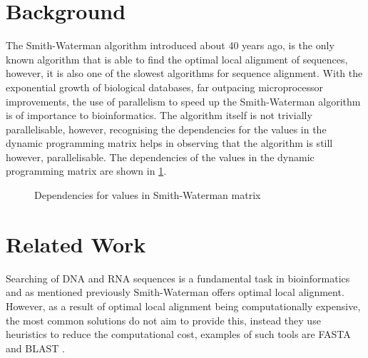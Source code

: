 \documentclass[manuscript,screen, nonacm=true]{acmart}
\begin{document}
\section{Background}
The Smith-Waterman \cite{smith1981identification} algorithm introduced about 40 years ago, is the only known algorithm that is able to find the optimal local alignment of sequences, however, it is also one of the slowest algorithms for sequence alignment. With the exponential growth of biological databases, far outpacing microprocessor improvements, the use of parallelism to speed up the Smith-Waterman algorithm is of importance to bioinformatics. The algorithm itself is not trivially parallelisable, however, recognising the dependencies for the values in the dynamic programming matrix helps in observing that the algorithm is still however, parallelisable. The dependencies of the values in the dynamic programming matrix are shown in \cref{fig:smiwatdeps}.
\begin{figure}[!h]
\centering
\caption{Dependencies for values in Smith-Waterman matrix}
\label{fig:smiwatdeps}
\end{figure}

\section{Related Work}
Searching of DNA and RNA sequences is a fundamental task in bioinformatics and as mentioned previously Smith-Waterman offers optimal local alignment. However, as a result of optimal local alignment being computationally expensive, the most common solutions do not aim to provide this, instead they use heuristics to reduce the computational cost, examples of such tools are FASTA \cite{pearson1988improved} and BLAST \cite{altschul1997gapped}.
\end{document}
